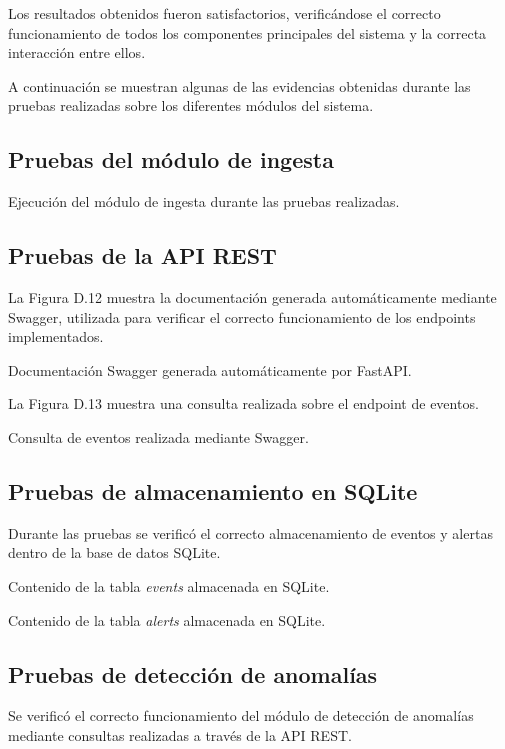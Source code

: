 Los resultados obtenidos fueron satisfactorios, verificándose el correcto funcionamiento de todos los componentes principales del sistema y la correcta interacción entre ellos.

A continuación se muestran algunas de las evidencias obtenidas durante las pruebas realizadas sobre los diferentes módulos del sistema.

\subsection{Pruebas del módulo de ingesta}
{Ejecución del módulo de ingesta durante las pruebas realizadas.}

\subsection{Pruebas de la API REST}

La Figura D.12 muestra la documentación generada automáticamente mediante Swagger, utilizada para verificar el correcto funcionamiento de los endpoints implementados.

{Documentación Swagger generada automáticamente por FastAPI.}

La Figura D.13 muestra una consulta realizada sobre el endpoint de eventos.

{Consulta de eventos realizada mediante Swagger.}

\subsection{Pruebas de almacenamiento en SQLite}

Durante las pruebas se verificó el correcto almacenamiento de eventos y alertas dentro de la base de datos SQLite.

{Contenido de la tabla \textit{events} almacenada en SQLite.}

{Contenido de la tabla \textit{alerts} almacenada en SQLite.}

\subsection{Pruebas de detección de anomalías}

Se verificó el correcto funcionamiento del módulo de detección de anomalías mediante consultas realizadas a través de la API REST.

